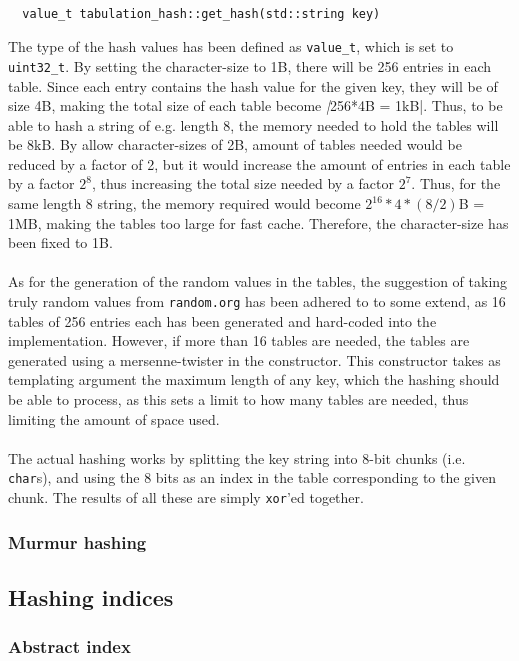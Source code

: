 \documentclass[11pt]{article} %
\begin{document}
\begin{lstlisting}[frame=single]  % Start your code-block

  value_t tabulation_hash::get_hash(std::string key)
\end{lstlisting}

The type of the hash values has been defined as \verb|value_t|, which is set to \verb|uint32_t|. By setting the character-size to 1B, there will be 256 entries in each table. Since each entry contains the hash value for the given key, they will be of size 4B, making the total size of each table become \emph|256*4B = 1kB|. Thus, to be able to hash a string of e.g. length 8, the memory needed to hold the tables will be 8kB. By allow character-sizes of 2B, amount of tables needed would be reduced by a factor of 2, but it would increase the amount of entries in each table by a factor $2^{8}$, thus increasing the total size needed by a factor $2^7$. Thus, for the same length 8 string, the memory required would become $2^{16}*4*(8/2)$B = 1MB, making the tables too large for fast cache. Therefore, the character-size has been fixed to 1B.\\
\\
As for the generation of the random values in the tables, the suggestion of taking truly random values from \verb|random.org| has been adhered to to some extend, as 16 tables of 256 entries each has been generated and hard-coded into the implementation. However, if more than 16 tables are needed, the tables are generated using a mersenne-twister in the constructor. This constructor takes as templating argument the maximum length of any key, which the hashing should be able to process, as this sets a limit to how many tables are needed, thus limiting the amount of space used. \\
\\
The actual hashing works by splitting the key string into 8-bit chunks (i.e. \verb|char|s), and using the 8 bits as an index in the table corresponding to the given chunk. The results of all these are simply \verb|xor|'ed together.

\subsubsection{Murmur hashing}

\subsection{Hashing indices}
\subsubsection{Abstract index}
\end{document}
